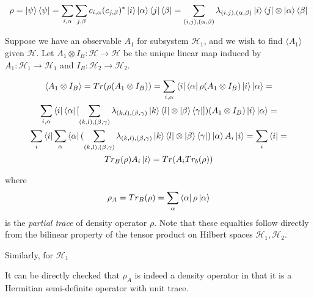 \documentclass{../quantum.tex}
\begin{document}
$$ \rho = \ket{\psi}\bra{\psi} = \sum_{i,\alpha}\sum_{j,\beta} c_{i,\alpha}(c_{j,\beta})^*\ket{i}\ket{\alpha}\bra{j}\bra{\beta} = \sum_{(i,j),(\alpha,\beta)} \lambda_{(i,j),(\alpha,\beta)} \ket{i}\bra{j}\otimes \ket{\alpha}\bra{\beta}$$

Suppose we have an observable $A_1$ for subsystem $\mathcal{H}_1$, and we wish to find $\langle A_1 \rangle$ given $\mathcal{H}$. Let $A_1 \otimes I_B: \mathcal{H} \rightarrow \mathcal{H}$ be the unique linear map induced by $A_1:\mathcal{H}_1 \rightarrow \mathcal{H}_1$ and $I_B: \mathcal{H}_2 \rightarrow \mathcal{H}_2$.

\begin{gather}
  \langle A_1 \otimes I_B \rangle = Tr(\rho(A_1 \otimes I_B)) = \sum_{i,\alpha} \bra{i}\bra{\alpha}\rho(A_1 \otimes I_B) \ket{i}\ket{\alpha} = \\
  \sum_{i,\alpha} \bra{i}\bra{\alpha}[
  \sum_{(k,l),(\beta,\gamma)} \lambda_{(k,l),(\beta,\gamma)} \ket{k}\bra{l}\otimes \ket{\beta}\bra{\gamma}]
  )(A_1 \otimes I_B)\ket{i}\ket{\alpha} = \\
  \sum_{i} \bra{i} \sum_{\alpha} \bra{\alpha}(\sum_{(k,l),(\beta,\gamma)}
   \lambda_{(k,l),(\beta,\gamma)} \ket{k}\bra{l}\otimes \ket{\beta}\bra{\gamma})\ket{\alpha} A_i \ket{i} = \sum_{i} \bra{i} = \\ Tr_B(\rho)A_i \ket{i} = Tr(A_iTr_b(\rho))
\end{gather}

where $$ \rho_A = Tr_B(\rho) = \sum_{\alpha} \bra{\alpha} \rho \ket{\alpha} $$ is the \textit{partial trace} of density operator $\rho$. Note that these equalties follow directly from the bilinear property of the tensor product on Hilbert spaces $\mathcal{H}_1,\mathcal{H}_2$.

Similarly, for $\mathcal{H}_1$

It can be directly checked that $\rho_A$ is indeed a density operator in that it is a Hermitian semi-definite operator with unit trace.
\end{document}
